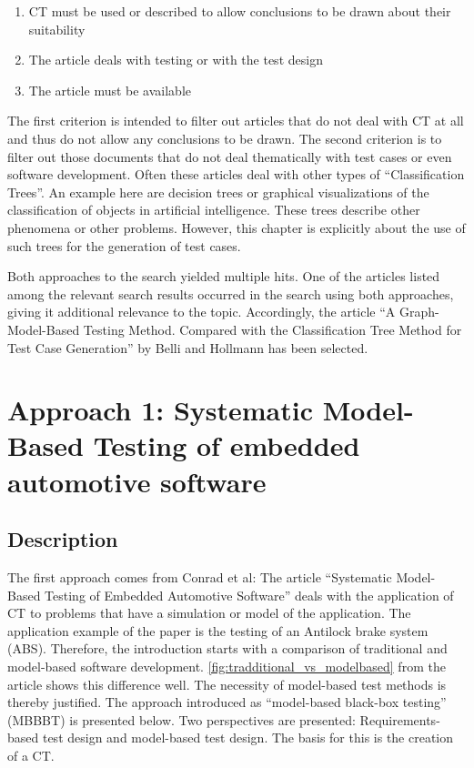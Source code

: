 \begin{enumerate}
\item CT must be used or described to allow conclusions to be drawn about their suitability
\item The article deals with testing or with the test design
\item The article must be available
\end{enumerate}

The first criterion is intended to filter out articles that do not deal with CT at all and thus do not allow any conclusions to be drawn. The second criterion is to filter out those documents that do not deal thematically with test cases or even software development. Often these articles deal with other types of \enquote{Classification Trees}. An example here are decision trees or graphical visualizations of the classification of objects in artificial intelligence. These trees describe other phenomena or  other problems. However, this chapter is explicitly about the use of such trees for the generation of test cases.

Both approaches to the search yielded multiple hits. One of the articles listed among the relevant search results occurred in the search using both approaches, giving it additional relevance to the topic. Accordingly, the article \enquote{A Graph-Model-Based Testing Method. Compared with the Classification Tree Method for Test Case Generation} by Belli and Hollmann\cite{Belli} has been selected.

\pagebreak

\section{Approach 1: Systematic Model-Based Testing of embedded automotive software}
\label{Kap:Approach1}

\subsection{Description}

The first approach comes from Conrad et al\cite{Conrad}: The article \enquote{Systematic Model-Based Testing of Embedded Automotive Software} deals with the application of CT to problems that have a simulation or model of the application. The application example of the paper is the testing of an Antilock brake system (ABS). Therefore, the introduction starts with a comparison of traditional and model-based software development. \autoref{fig:tradditional_vs_modelbased} from the article shows this difference well. The necessity of model-based test methods is thereby justified. The approach introduced as \enquote{model-based black-box testing} (MBBBT) is presented below. Two perspectives are presented: Requirements-based test design and model-based test design. The basis for this is the creation of a CT.


